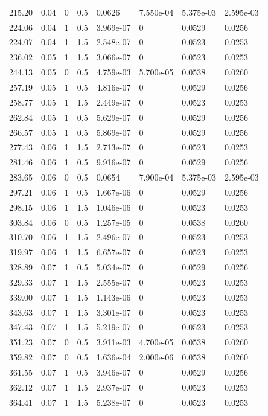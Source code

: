 \documentclass[preview]{standalone}
\begin{document}
{{\begin{tabular}{L{1.2cm}C{1.2cm} C{0.3cm}C{0.5cm} C{1.4cm}C{1.4cm} C{1.4cm}C{1.4cm}}
  215.20  &  0.04  & 0     & 0.5 &  0.0626  & 7.550e-04  & 5.375e-03 &  2.595e-03   \\ 
  224.06  &  0.04  & 1     & 0.5 &  3.969e-07  & 0  & 0.0529 &  0.0256   \\ 
  224.07  &  0.04  & 1     & 1.5 &  2.548e-07  & 0  & 0.0523 &  0.0253   \\ 
  236.02  &  0.05  & 1     & 1.5 &  3.066e-07  & 0  & 0.0523 &  0.0253   \\ 
  244.13  &  0.05  & 0     & 0.5 &  4.759e-03  & 5.700e-05  & 0.0538 &  0.0260   \\ 
  257.19  &  0.05  & 1     & 0.5 &  4.816e-07  & 0  & 0.0529 &  0.0256   \\ 
  258.77  &  0.05  & 1     & 1.5 &  2.449e-07  & 0  & 0.0523 &  0.0253   \\ 
  262.84  &  0.05  & 1     & 0.5 &  5.629e-07  & 0  & 0.0529 &  0.0256   \\ 
  266.57  &  0.05  & 1     & 0.5 &  5.869e-07  & 0  & 0.0529 &  0.0256   \\ 
  277.43  &  0.06  & 1     & 1.5 &  2.713e-07  & 0  & 0.0523 &  0.0253   \\ 
  281.46  &  0.06  & 1     & 0.5 &  9.916e-07  & 0  & 0.0529 &  0.0256   \\ 
  283.65  &  0.06  & 0     & 0.5 &  0.0654  & 7.900e-04  & 5.375e-03 &  2.595e-03   \\ 
  297.21  &  0.06  & 1     & 0.5 &  1.667e-06  & 0  & 0.0529 &  0.0256   \\ 
  298.15  &  0.06  & 1     & 1.5 &  1.046e-06  & 0  & 0.0523 &  0.0253   \\ 
  303.84  &  0.06  & 0     & 0.5 &  1.257e-05  & 0  & 0.0538 &  0.0260   \\ 
  310.70  &  0.06  & 1     & 1.5 &  2.496e-07  & 0  & 0.0523 &  0.0253   \\ 
  319.97  &  0.06  & 1     & 1.5 &  6.657e-07  & 0  & 0.0523 &  0.0253   \\ 
  328.89  &  0.07  & 1     & 0.5 &  5.034e-07  & 0  & 0.0529 &  0.0256   \\ 
  329.33  &  0.07  & 1     & 1.5 &  2.555e-07  & 0  & 0.0523 &  0.0253   \\ 
  339.00  &  0.07  & 1     & 1.5 &  1.143e-06  & 0  & 0.0523 &  0.0253   \\ 
  343.63  &  0.07  & 1     & 1.5 &  3.301e-07  & 0  & 0.0523 &  0.0253   \\ 
  347.43  &  0.07  & 1     & 1.5 &  5.219e-07  & 0  & 0.0523 &  0.0253   \\ 
  351.23  &  0.07  & 0     & 0.5 &  3.911e-03  & 4.700e-05  & 0.0538 &  0.0260   \\ 
  359.82  &  0.07  & 0     & 0.5 &  1.636e-04  & 2.000e-06  & 0.0538 &  0.0260   \\ 
  361.55  &  0.07  & 1     & 0.5 &  3.946e-07  & 0  & 0.0529 &  0.0256   \\ 
  362.12  &  0.07  & 1     & 1.5 &  2.937e-07  & 0  & 0.0523 &  0.0253   \\ 
  364.41  &  0.07  & 1     & 1.5 &  5.238e-07  & 0  & 0.0523 &  0.0253   \\ 
\hline 
\end{tabular} 

}}
\end{document}
